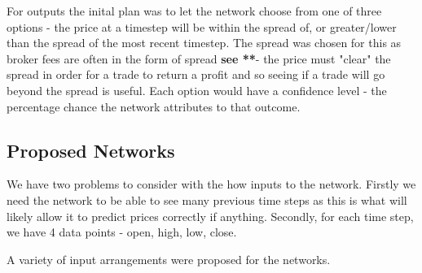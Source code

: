         For outputs the inital plan was to let the network choose from one of three options - the price at a timestep will be within the spread of, or greater/lower than the spread of the most recent timestep. The spread was chosen for this as broker fees are often in the form of spread \textbf{see **}- the price must "clear" the spread in order for a trade to return a profit and so seeing if a trade will go beyond the spread is useful. Each option would have a confidence level - the percentage chance the network attributes to that outcome.

        \subsection{Proposed Networks}

        We have two problems to consider with the how inputs to the network. Firstly we need the network to be able to see many previous time steps as this is what will likely allow it to predict prices correctly if anything. Secondly, for each time step, we have 4 data points - open, high, low, close.

        A variety of input arrangements were proposed for the networks.

